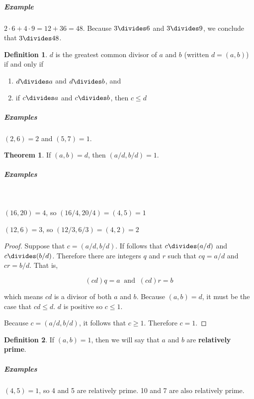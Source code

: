 \documentclass{article}
\theoremstyle{definition} %
\newtheorem{theorem}{Theorem}[section] %
\theoremstyle{definition}
\theoremstyle{definition}
\theoremstyle{definition}
\newtheorem{definition}{Definition}[section]
\begin{document}
  \subparagraph{Example} $2 \cdot 6 + 4 \cdot 9 = 12 + 36 = 48$. Because $3 \divides 6$ and $3 \divides 9$, we conclude that $3 \divides 48$.
  
  \begin{definition}
    $d$ is the greatest common divisor of $a$ and $b$ (written $d = (a, b)$) if and only if
    
    \begin{enumerate}[label=(\roman*)]
      \item $d \divides a$ and $d \divides b$, and
    
      \item if $c \divides a$ and $c \divides b$, then $c \le d$
    \end{enumerate}
  \end{definition}
  
  \subparagraph{Examples} $(2, 6) = 2$ and $(5, 7) = 1$.
  
  \begin{theorem}
    If $(a, b) = d$, then $(a / d, b / d) = 1$.
  \end{theorem}
  
  \subparagraph{Examples} \ 
  
  $(16, 20) = 4$, so $(16 / 4, 20 / 4) = (4, 5) = 1$
  
  $(12, 6) = 3$, so $(12 / 3, 6 / 3) = (4, 2) = 2$
  
  \begin{proof}
    Suppose that $c = (a / d, b / d)$. If follows that $c \divides (a / d)$ and $c \divides (b / d)$. Therefore there are
    integers $q$ and $r$ such that $cq = a / d$ and $cr = b / d$. That is,
    
      \begin{equation*}
        (cd)q = a \;\;\text{and}\;\; (cd)r = b
      \end{equation*}
    
    which means $cd$ is a divisor of both $a$ and $b$. Because $(a, b) = d$, it must be the case that $cd \leq d$.
    $d$ is positive so $c \leq 1$.
    
    Because $c = (a / d, b / d)$, it follows that $c \geq 1$. Therefore $c = 1$.
  \end{proof}
  
  \begin{definition}
    If $(a, b) = 1$, then we will say that $a$ and $b$ are \textbf{relatively prime}.
  \end{definition}
  
  \subparagraph{Examples} $(4, 5) = 1$, so 4 and 5 are relatively prime. 10 and 7 are also relatively prime.
  
\end{document}
